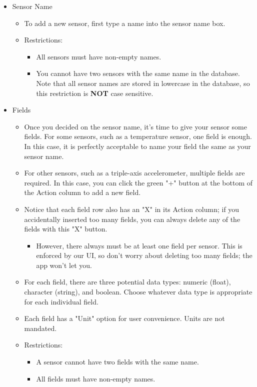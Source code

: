 \documentclass[12pt, letterpaper]{article}
\begin{document}
{{{{{{{{{{{\begin{itemize}
	\item Sensor Name
	\begin{itemize}
		\item To add a new sensor, first type a name into the sensor name box.
		\item Restrictions:
		\begin{itemize}
			\item All sensors must have non-empty names.
			\item You cannot have two sensors with the same name in the database. Note that all sensor names are stored in lowercase in the database, so this restriction is \textbf{NOT} case sensitive.
		\end{itemize}
	\end{itemize}
	\item Fields
	\begin{itemize}
		\item Once you decided on the sensor name, it's time to give your sensor some fields. For some sensors, such as a temperature sensor, one field is enough. In this case, it is perfectly acceptable to name your field the same as your sensor name.
		\item For other sensors, such as a triple-axis accelerometer, multiple fields are required. In this case, you can click the green "+" button at the bottom of the Action column to add a new field.
		\item Notice that each field row also has an "X" in its Action column; if you accidentally inserted too many fields, you can always delete any of the fields with this "X" button.
		\begin{itemize}
			\item However, there always must be at least one field per sensor. This is enforced by our UI, so don't worry about deleting too many fields; the app won't let you.
		\end{itemize}
		\item For each field, there are three potential data types: numeric (float), character (string), and boolean. Choose whatever data type is appropriate for each individual field.
		\item Each field has a "Unit" option for user convenience. Units are not mandated.
		\item Restrictions:
		\begin{itemize}
			\item A sensor cannot have two fields with the same name.
			\item All fields must have non-empty names.

\end{itemize}
\end{itemize}
\end{itemize}}}}}}}}}}}}
\end{document}
